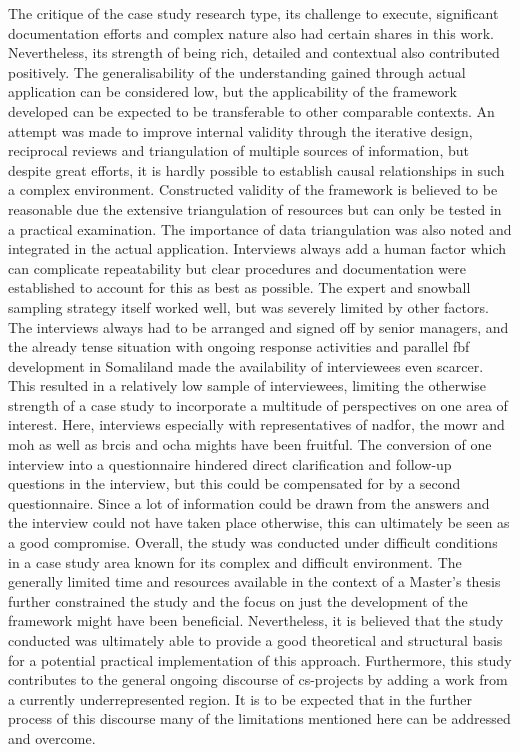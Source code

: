 The critique of the case study research type, its challenge to execute, significant documentation efforts and complex nature also had certain shares in this work. Nevertheless, its strength of being rich, detailed and contextual also contributed positively. The generalisability of the understanding gained through actual application can be considered low, but the applicability of the framework developed can be expected to be transferable to other comparable contexts.\newline
An attempt was made to improve internal validity through the iterative design, reciprocal reviews and triangulation of multiple sources of information, but despite great efforts, it is hardly possible to establish causal relationships in such a complex environment. Constructed validity of the framework is believed to be reasonable due the extensive triangulation of resources but can only be tested in a practical examination. The importance of data triangulation was also noted and integrated in the actual application. Interviews always add a human factor which can complicate repeatability but clear procedures and documentation were established to account for this as best as possible. The expert and snowball sampling strategy itself worked well, but was severely limited by other factors. The interviews always had to be arranged and signed off by senior managers, and the already tense situation with ongoing response activities and parallel \acrshort{fbf} development in Somaliland made the availability of interviewees even scarcer. This resulted in a relatively low sample of interviewees, limiting the otherwise strength of a case study to incorporate a multitude of perspectives on one area of interest. Here, interviews especially with representatives of \acrshort{nadfor}, the \acrshort{mowr} and \acrshort{moh} as well as \acrshort{brcis} and \acrshort{ocha} mights have been fruitful. The conversion of one interview into a questionnaire hindered direct clarification and follow-up questions in the interview, but this could be compensated for by a second questionnaire. Since a lot of information could be drawn from the answers and the interview could not have taken place otherwise, this can ultimately be seen as a good compromise.\newline
Overall, the study was conducted under difficult conditions in a case study area known for its complex and difficult environment. The generally limited time and resources available in the context of a Master's thesis further constrained the study and the focus on just the development of the framework might have been beneficial. Nevertheless, it is believed that the study conducted was ultimately able to provide a good theoretical and structural basis for a potential practical implementation of this approach. Furthermore, this study contributes to the general ongoing discourse of \acrlong{cs}-projects by adding a work from a currently underrepresented region. It is to be expected that in the further process of this discourse many of the limitations mentioned here can be addressed and overcome.

